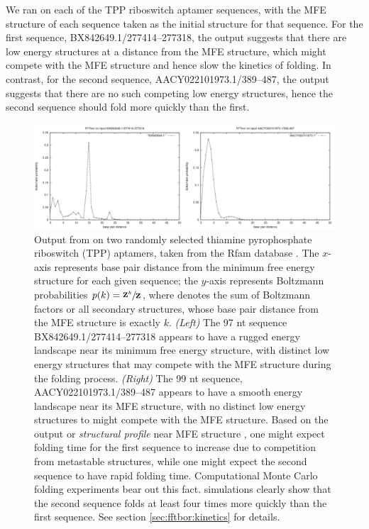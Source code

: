 We ran \fftbor on each of the TPP riboswitch aptamer
sequences, with the MFE structure of each
sequence taken as the initial structure \strSt for that sequence. For the
first sequence, BX842649.1/277414--277318, the \fftbor output
suggests that there are low energy structures
at a distance from the MFE structure, which might compete with the MFE
structure and hence slow the kinetics of folding. In contrast, for the
second sequence, AACY022101973.1/389--487, the \fftbor output suggests
that there are no such competing low energy structures, hence
the second sequence should fold more quickly than the first.

\begin{figure}[!ht]
\centering
\includegraphics[width=.9\textwidth]{Figures/FFTbor/tppDistributions.pdf}
\caption{Output from \fftbor on two randomly selected
thiamine pyrophosphate riboswitch (TPP) aptamers, taken from the Rfam database
\cite{Gardner.nar11}. The $x$-axis represents base pair distance from the
minimum free energy structure for each given sequence; the $y$-axis represents
Boltzmann probabilities $p(k) = \sfrac{{\bf Z}^{k}_{}}{{\bf Z}^{}_{}}$, where
 denotes the sum of Boltzmann factors or all secondary structures,
whose base pair distance from the MFE structure is exactly $k$.
{\em (Left)}
The 97 nt sequence BX842649.1/277414--277318 appears to have a rugged energy
landscape near its minimum free energy structure, with distinct
low energy structures that may compete with the MFE structure during the
folding process.
{\em (Right)}
The 99 nt sequence, AACY022101973.1/389--487 appears to have a smooth energy
landscape near its MFE structure, with no distinct low energy structures
to might compete with the MFE structure.
Based on the \fftbor output or {\em structural profile} near MFE
structure \strSt, one might expect
folding time for the first sequence to increase due to competition from
metastable structures, while one might expect the second sequence to have
rapid folding time.
Computational Monte Carlo folding experiments bear out this fact.
\kinfold \cite{flamm} simulations clearly show that the second
sequence folds
at least four times more quickly than the first sequence. See section
\ref{sec:fftbor:kinetics} for
details.}
\label{fig:fftbor:tppDistributions}
\end{figure}

